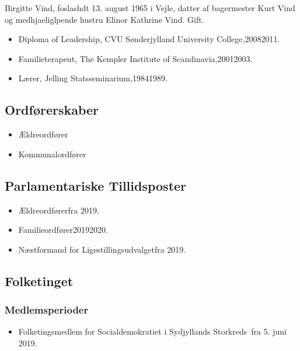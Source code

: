 \documentclass[11pt, a4paper]{awesome-cv}
\begin{document}
\makecvheader[R]
\makelettertitle
\begin{cvletter}
Birgitte Vind, foslashdt 13. august 1965 i Vejle, datter af bagermester Kurt Vind og medhjaeliglpende hustru Elinor Kathrine Vind. Gift.

\begin{itemize}
\item Diploma of Leadership, CVU Sønderjylland University College,20082011.
\item Familieterapeut, The Kempler Institute of Scandinavia,20012003.
\item Lærer, Jelling Statsseminarium,19841989.
\end{itemize}
\subsection*{Ordførerskaber}
\begin{itemize}
\item Ældreordfører
\item Kommunalordfører
\end{itemize}
\subsection*{Parlamentariske Tillidsposter}
\begin{itemize}
\item Ældreordførerfra 2019.
\item Familieordfører20192020.
\item Næstformand for Ligestillingsudvalgetfra 2019.
\end{itemize}
\subsection*{Folketinget}
\subsubsection*{Medlemsperioder}
\begin{itemize}
\item Folketingsmedlem for Socialdemokratiet i Sydjyllands Storkreds fra 5. juni 2019.
\end{itemize}

\end{cvletter}
\end{document}
